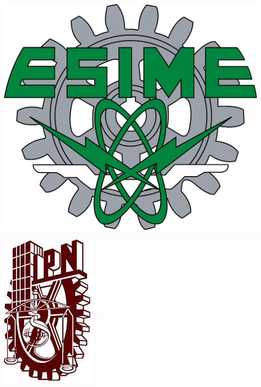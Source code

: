 
\begin{center}											            							%
\newcommand{\HRule}{\rule{\linewidth}{0.5mm}}	                                               %
\begin{minipage}{0.49\textwidth} \begin{flushleft}
\includegraphics[scale = 0.12]{Imagenes/logoesime}
\end{flushleft}\end{minipage}
\begin{minipage}{0.49\textwidth} \begin{flushright}
\includegraphics[scale = 0.25]{Imagenes/IPN}
\end{flushright}\end{minipage}


\end{center}
